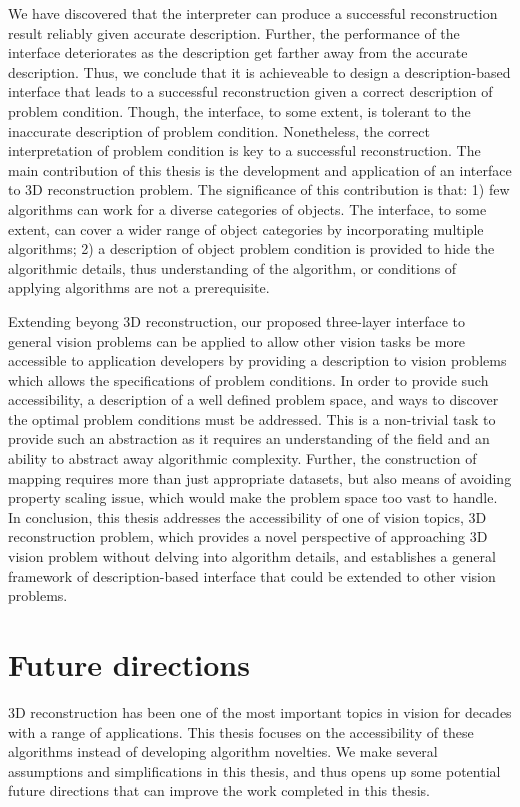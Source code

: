 We have discovered that the interpreter can produce a successful reconstruction result reliably given accurate description. Further, the performance of the interface deteriorates as the description get farther away from the accurate description. Thus, we conclude that it is achieveable to design a description-based interface that leads to a successful reconstruction given a correct description of problem condition. Though, the interface, to some extent, is tolerant to the inaccurate description of problem condition. Nonetheless, the correct interpretation of problem condition is key to a successful reconstruction. The main contribution of this thesis is the development and application of an interface to 3D reconstruction problem. The significance of this contribution is that: 1) few algorithms can work for a diverse categories of objects. The interface, to some extent, can cover a wider range of object categories by incorporating multiple algorithms; 2) a description of object problem condition is provided to hide the algorithmic details, thus understanding of the algorithm, or conditions of applying algorithms are not a prerequisite.

Extending beyong 3D reconstruction, our proposed three-layer interface to general vision problems can be applied to allow other vision tasks be more accessible to application developers by providing a description to vision problems which allows the specifications of problem conditions. In order to provide such accessibility, a description of a well defined problem space, and ways to discover the optimal problem conditions must be addressed. This is a non-trivial task to provide such an abstraction as it requires an understanding of the field and an ability to abstract away algorithmic complexity. Further, the construction of mapping requires more than just appropriate datasets, but also means of avoiding property scaling issue, which would make the problem space too vast to handle. In conclusion, this thesis addresses the accessibility of one of vision topics, 3D reconstruction problem, which provides a novel perspective of approaching 3D vision problem without delving into algorithm details, and establishes a general framework of description-based interface that could be extended to other vision problems.

\section{Future directions}
3D reconstruction has been one of the most important topics in vision for decades with a range of applications. This thesis focuses on the accessibility of these algorithms instead of developing algorithm novelties. We make several assumptions and simplifications in this thesis, and thus opens up some potential future directions that can improve the work completed in this thesis.

